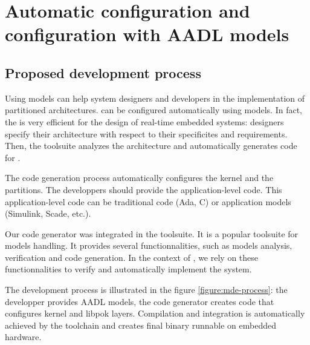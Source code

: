 %
%
%
%
%

\chapter{Automatic configuration and configuration with AADL models}
   \label{chapter-automatic-configuration}

   \section{Proposed development process}
   Using \aadl models can help system designers and developers in the
   implementation of partitioned architectures. \pok can be configured
   automatically using \aadl models. In fact, the \aadl is very efficient for
   the design of real-time embedded systems: designers specify their
   architecture with respect to their specificites and requirements. Then, the
   \ocarina toolsuite analyzes the architecture and automatically generates
   code for \pok.

   The code generation process automatically configures the kernel and
   the partitions. The developpers should provide the application-level code.
   This application-level code can be traditional code (Ada, C) or 
   application models (Simulink, Scade, etc.).

   Our code generator was integrated in the \ocarina \aadl toolsuite. It is a
   popular toolsuite for \aadl models handling. It provides several
   functionnalities, such as models analysis, verification and code generation.
   In the context of \pok, we rely on these functionnalities to verify and
   automatically implement the system.


   The development process is illustrated in the figure
   \ref{figure:mde-process}: the developper provides AADL models, the code
   generator creates code that configures kernel and libpok layers. Compilation
   and integration is automatically achieved by the toolchain and creates final
   binary runnable on embedded hardware.


